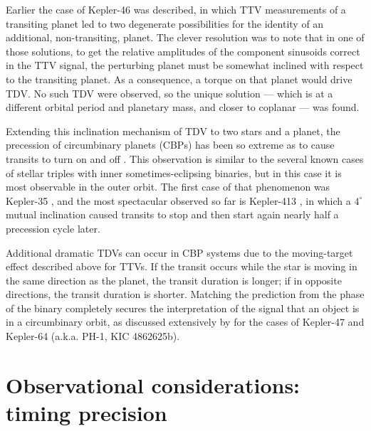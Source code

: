 \documentclass[graybox,natbib,nosecnum]{svmult}
\begin{document}
Earlier the case of Kepler-46 was described, in which TTV measurements of a transiting planet led to two degenerate possibilities for the identity of an additional, non-transiting, planet. The clever resolution \citep{2012Sci...336.1133N} was to note that in one of those solutions, to get the relative amplitudes of the component sinusoids correct in the TTV signal, the perturbing planet must be somewhat inclined with respect to the transiting planet.  As a consequence, a torque on that planet would drive TDV.  No such TDV were observed, so the unique solution --- which is at a different orbital period and planetary mass, and closer to coplanar --- was found. 

Extending this inclination mechanism of TDV to two stars and a planet, the precession of circumbinary planets (CBPs) has been so extreme as to cause transits to turn on and off \citep{2017MNRAS.465.3235M}.   This observation is similar to the several known cases of stellar triples with inner sometimes-eclipsing binaries, but in this case it is most observable in the outer orbit.  The first case of that phenomenon was Kepler-35 \citep{2012Natur.481..475W}, and the most spectacular observed so far is Kepler-413 \citep{2014ApJ...784...14K}, in which a $4^\circ$ mutual inclination caused transits to stop and then start again nearly half a precession cycle later.  

Additional dramatic TDVs can occur in CBP systems due to the moving-target effect described above for TTVs.  If the transit occurs while the star is moving in the same direction as the planet, the transit duration is longer; if in opposite directions, the transit duration is shorter.  Matching the prediction from the phase of the binary completely secures the interpretation of the signal that an object is in a circumbinary orbit, as discussed extensively by \cite{2013ApJ...770...52K} for the cases of Kepler-47 and Kepler-64 (a.k.a. PH-1, KIC 4862625b).


\section{Observational considerations: timing precision} %
\end{document}
